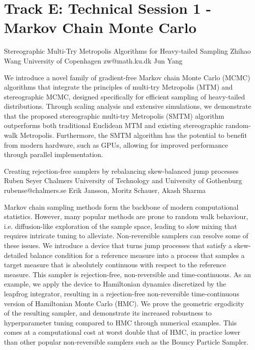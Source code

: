 \section{Track E: Technical Session 1 - Markov Chain Monte Carlo}\newpage

\begin{talk}
  {Stereographic Multi-Try Metropolis Algorithms for Heavy-tailed Sampling}%
  {Zhihao Wang}%
  {University of Copenhagen}%
  {zw@math.ku.dk}%
  {Jun Yang}%
  
    
   
We introduce a novel family of gradient-free Markov chain Monte Carlo (MCMC) algorithms that integrate the principles of multi-try Metropolis (MTM) and stereographic MCMC, designed specifically for efficient sampling of heavy-tailed distributions. Through scaling analysis and extensive simulations, we demonstrate that the proposed stereographic multi-try Metropolis (SMTM) algorithm outperforms both traditional Euclidean MTM and existing stereographic random-walk Metropolis. Furthermore, the SMTM algorithm has the potential to benefit from modern hardware, such as GPUs, allowing for improved performance through parallel implementation.
\end{talk}

\begin{talk}
  {Creating rejection-free samplers by rebalancing skew-balanced jump processes}%
  {Ruben Seyer}%
  {Chalmers University of Technology and University of Gothenburg}%
  {rubense@chalmers.se}%
  {Erik Jansson, Moritz Schauer, Akash Sharma}%
  
    
   
Markov chain sampling methods form the backbone of modern computational statistics.
However, many popular methods are prone to random walk behaviour, i.e.\@{} diffusion-like exploration of the sample space, leading to slow mixing that requires intricate tuning to alleviate.
Non-reversible samplers can resolve some of these issues.
We introduce a device that turns jump processes that satisfy a skew-detailed balance condition for a reference measure into a process that samples a target measure that is absolutely continuous with respect to the reference measure.
This sampler is rejection-free, non-reversible and time-continuous.
As an example, we apply the device to Hamiltonian dynamics discretized by the leapfrog integrator, resulting in a rejection-free non-reversible time-continuous version of Hamiltonian Monte Carlo (HMC).
We prove the geometric ergodicity of the resulting sampler, and demonstrate its increased robustness to hyperparameter tuning compared to HMC through numerical examples.
This comes at a computational cost at worst double that of HMC, in practice lower than other popular non-reversible samplers such as the Bouncy Particle Sampler.
\end{talk}

